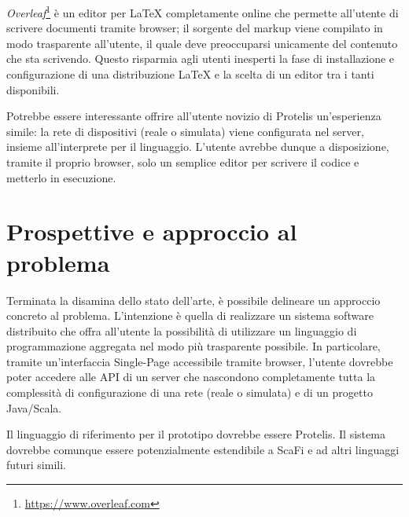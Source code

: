   \emph{Overleaf}\footnote{\url{https://www.overleaf.com}} è un editor per \LaTeX{} completamente online che permette all'utente di scrivere documenti tramite browser;
  il sorgente del markup viene compilato in modo trasparente all'utente, il quale deve preoccuparsi unicamente del contenuto che sta scrivendo.
  Questo risparmia agli utenti inesperti la fase di installazione e configurazione di una distribuzione \LaTeX{} e la scelta di un editor tra i tanti disponibili.

  Potrebbe essere interessante offrire all'utente novizio di Protelis un'esperienza simile:
  la rete di dispositivi (reale o simulata) viene configurata nel server, insieme all'interprete per il linguaggio.
  L'utente avrebbe dunque a disposizione, tramite il proprio browser, solo un semplice editor per scrivere il codice e metterlo in esecuzione.

  \section{Prospettive e approccio al problema}\label{sec:prospective}


  Terminata la disamina dello stato dell'arte, è possibile delineare un approccio concreto al problema.
  L'intenzione è quella di realizzare un sistema software distribuito che offra all'utente la possibilità di utilizzare un linguaggio di programmazione aggregata nel modo più trasparente possibile.
  In particolare, tramite un'interfaccia Single-Page accessibile tramite browser, l'utente dovrebbe poter accedere alle API di un server che nascondono completamente tutta la complessità di configurazione di una rete (reale o simulata) e di un progetto Java/Scala.

  Il linguaggio di riferimento per il prototipo dovrebbe essere Protelis.
  Il sistema dovrebbe comunque essere potenzialmente estendibile a ScaFi e ad altri linguaggi futuri simili.
